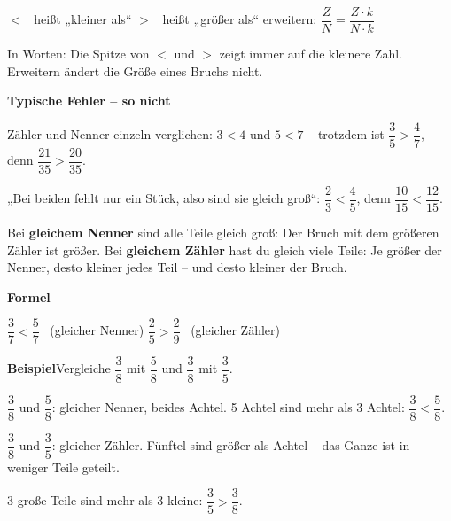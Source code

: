 \documentclass[11pt]{article}
\newcommand{\nr}[1]{\makebox[7mm][l]{\textbf{#1}}}
\begin{document}
\begin{tcolorbox}[colback=mbkasten,colframe=mbgrau,boxrule=0.5pt,arc=1mm,left=3mm,right=3mm,top=2mm,bottom=2mm,title={\bfseries Formel auf einen Blick},coltitle=black,colbacktitle=black!10]
{\Large $<$ \ heißt „kleiner als“ \qquad $>$ \ heißt „größer als“ \qquad erweitern: $\dfrac{Z}{N} = \dfrac{Z \cdot k}{N \cdot k}$}\par\medskip
In Worten: Die Spitze von $<$ und $>$ zeigt immer auf die kleinere Zahl. Erweitern ändert die Größe eines Bruchs nicht.\par\medskip
\end{tcolorbox}
\medskip\noindent\textbf{Typische Fehler – so nicht}\par\smallskip
\noindent\nr{$\times$}Zähler und Nenner einzeln verglichen: $3 < 4$ und $5 < 7$ – trotzdem ist $\dfrac{3}{5} > \dfrac{4}{7}$, denn $\dfrac{21}{35} > \dfrac{20}{35}$.\par
\noindent\nr{$\times$}„Bei beiden fehlt nur ein Stück, also sind sie gleich groß“: $\dfrac{2}{3} < \dfrac{4}{5}$, denn $\dfrac{10}{15} < \dfrac{12}{15}$.\par
\clearpage\label{s:A}\noindent\colorbox{black!12}{}\hspace{3mm}{\Large\bfseries Gleicher Nenner oder gleicher Zähler}\par\smallskip
\noindent Bei \textbf{gleichem Nenner} sind alle Teile gleich groß: Der Bruch mit dem größeren Zähler ist größer. Bei \textbf{gleichem Zähler} hast du gleich viele Teile: Je größer der Nenner, desto kleiner jedes Teil – und desto kleiner der Bruch.\par\medskip
\noindent\textbf{Formel}\par\nopagebreak\noindent\hspace*{4mm}\begin{minipage}{\dimexpr\linewidth-4mm\relax}$\dfrac{3}{7} < \dfrac{5}{7}$ \ (gleicher Nenner) \qquad $\dfrac{2}{5} > \dfrac{2}{9}$ \ (gleicher Zähler)\end{minipage}\par\medskip
\noindent\textbf{Beispiel}\quad Vergleiche $\dfrac{3}{8}$ mit $\dfrac{5}{8}$ und $\dfrac{3}{8}$ mit $\dfrac{3}{5}$.\par\smallskip
\noindent\begin{minipage}[t]{0.6\linewidth}\vspace{0pt}\par\noindent{}$\dfrac{3}{8}$ und $\dfrac{5}{8}$: gleicher Nenner, beides Achtel. 5 Achtel sind mehr als 3 Achtel: $\dfrac{3}{8} < \dfrac{5}{8}$.\par\smallskip\par\noindent{}$\dfrac{3}{8}$ und $\dfrac{3}{5}$: gleicher Zähler. Fünftel sind größer als Achtel – das Ganze ist in weniger Teile geteilt.\par\smallskip\par\noindent{}3 große Teile sind mehr als 3 kleine: $\dfrac{3}{5} > \dfrac{3}{8}$.\par\smallskip\end{minipage}\hfill
\end{document}
